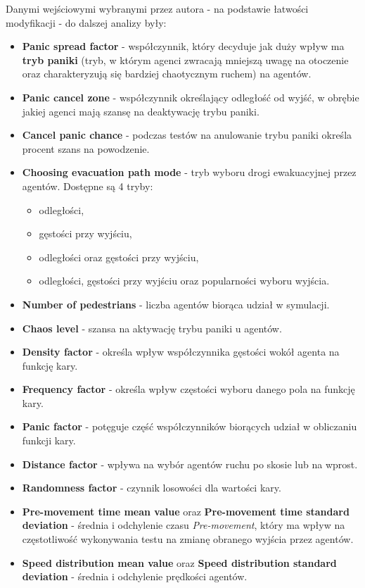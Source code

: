 \documentclass[12pt]{aghdpl}
\begin{document}
		Danymi wejściowymi wybranymi przez autora - na podstawie łatwości modyfikacji - do dalszej analizy były:\label{dane_do_dalszej_analizy}
		
		\begin{itemize}
		\item \textbf{Panic spread factor} - współczynnik, który decyduje jak duży wpływ ma \textbf{tryb paniki} (tryb, w którym agenci zwracają mniejszą uwagę na otoczenie oraz charakteryzują się bardziej chaotycznym ruchem) na agentów.
		\item \textbf{Panic cancel zone} - współczynnik określający odległość od wyjść, w obrębie jakiej agenci mają szansę na deaktywację trybu paniki.
		\item \textbf{Cancel panic chance} - podczas testów na anulowanie trybu paniki określa procent szans na powodzenie.
		\item \textbf{Choosing evacuation path mode} - tryb wyboru drogi ewakuacyjnej przez agentów. Dostępne są 4 tryby:
			\begin{itemize}
			\item odległości,
			\item gęstości przy wyjściu,
			\item odległości oraz gęstości przy wyjściu,
			\item odległości, gęstości przy wyjściu oraz popularności wyboru wyjścia.
			\end{itemize}
		\item \textbf{Number of pedestrians} - liczba agentów biorąca udział w symulacji.
		\item \textbf{Chaos level} - szansa na aktywację trybu paniki u agentów.
		\item \textbf{Density factor} - określa wpływ współczynnika gęstości wokół agenta na funkcję kary.
		\item \textbf{Frequency factor} - określa wpływ częstości wyboru danego pola na funkcję kary.
		\item \textbf{Panic factor} - potęguje część współczynników biorących udział w obliczaniu funkcji kary. 
		\item \textbf{Distance factor} - wpływa na wybór agentów ruchu po skosie lub na wprost.
		\item \textbf{Randomness factor} - czynnik losowości dla wartości kary.
		\item \textbf{Pre-movement time mean value} oraz \textbf{Pre-movement time standard deviation} - średnia i odchylenie czasu \textit{Pre-movement}, który ma wpływ na częstotliwość wykonywania testu na zmianę obranego wyjścia przez agentów.
		\item \textbf{Speed distribution mean value} oraz \textbf{Speed distribution standard deviation} - średnia i odchylenie prędkości agentów.
		\end{itemize}
		
\end{document}

